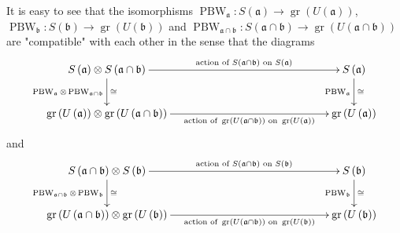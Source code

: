 \documentclass
[numbers=enddot,12pt,final,onecolumn,german,notitlepage]{scrartcl}%
\newcommand{\gr}{\operatorname*{gr}}
\newcommand{\fraka}{\mathfrak{a}}
\newcommand{\frakb}{\mathfrak{b}}
\newcommand{\PBW}{\operatorname*{PBW}}
\newcommand{\xycs}{\xymatrixcolsep}
\theoremstyle{definition}
\begin{document}
It is easy to see that the isomorphisms $\operatorname*{PBW}%
\nolimits_{\mathfrak{a}}:S\left(  \mathfrak{a}\right)  \rightarrow
\operatorname*{gr}\left(  U\left(  \mathfrak{a}\right)  \right)  $,
$\operatorname*{PBW}\nolimits_{\mathfrak{b}}:S\left(  \mathfrak{b}\right)
\rightarrow\operatorname*{gr}\left(  U\left(  \mathfrak{b}\right)  \right)  $
and $\operatorname*{PBW}\nolimits_{\mathfrak{a}\cap\mathfrak{b}}:S\left(
\mathfrak{a}\cap\mathfrak{b}\right)  \rightarrow\operatorname*{gr}\left(
U\left(  \mathfrak{a}\cap\mathfrak{b}\right)  \right)  $ are "compatible" with
each other in the sense that the diagrams%
\[%
\xycs{12pc}
\xymatrix{
S\left(\fraka\right) \otimes S\left(\fraka\cap\frakb\right) \ar[r]^-{\text
{action of }S\left(\fraka\cap\frakb\right)\text{ on }S\left(\fraka\right)}
\ar[d]_{\PBW_{\fraka}\otimes\PBW_{\fraka\cap\frakb}}^{\cong} & S\left
(\fraka\right) \ar[d]_{\PBW_{\fraka}}^{\cong} \\
\gr\left(U\left(\fraka\right)\right) \otimes\gr\left(U\left(\fraka\cap
\frakb\right)\right) \ar[r]_-{\text{action of }\gr\left(U\left(\fraka
\cap\frakb\right)\right)\text{ on }\gr\left(U\left(\fraka\right)\right)}
& \gr\left(U\left(\fraka\right)\right)
}%
\]
and%
\[%
\xycs{12pc}
\xymatrix{
S\left(\fraka\cap\frakb\right) \otimes S\left(\frakb\right) \ar[r]^-{\text
{action of }S\left(\fraka\cap\frakb\right)\text{ on }S\left(\frakb\right)}
\ar[d]_{\PBW_{\fraka\cap\frakb}\otimes\PBW_{\frakb}}^{\cong} & S\left
(\frakb\right) \ar[d]_{\PBW_{\frakb}}^{\cong} \\
\gr\left(U\left(\fraka\cap\frakb\right)\right) \otimes\gr\left(U\left
(\frakb\right)\right) \ar[r]_-{\text{action of }\gr\left(U\left(\fraka
\cap\frakb\right)\right)\text{ on }\gr\left(U\left(\frakb\right)\right)}
& \gr\left(U\left(\frakb\right)\right)
}%
\]
\end{document}
